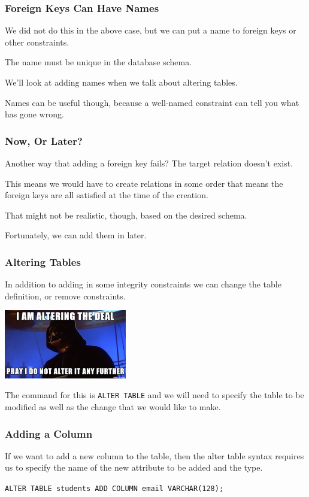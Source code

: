 \begin{frame}
\frametitle{Foreign Keys Can Have Names}

We did not do this in the above case, but we can put a name to foreign keys or other constraints. 

The name must be unique in the database schema. 

We'll look at adding names when we talk about altering tables. 

Names can be useful though, because a well-named constraint can tell you what has gone wrong.

\end{frame}

\begin{frame}
\frametitle{Now, Or Later?}

Another way that adding a foreign key fails? The target relation doesn't exist. 

This means we would have to create relations in some order that means the foreign keys are all satisfied at the time of the creation. 

That might not be realistic, though, based on the desired schema. 

Fortunately, we can add them in later.

\end{frame}


\begin{frame}
\frametitle{Altering Tables}

In addition to adding in some integrity constraints we can change the table definition, or remove constraints. 

\begin{center}
	\includegraphics[width=0.4\textwidth]{images/alter-deal.jpg}
\end{center}

The command for this is \texttt{ALTER TABLE} and we will need to specify the table to be modified as well as the change that we would like to make. 

\end{frame}

\begin{frame}
\frametitle{Adding a Column}

If we want to add a new column to the table, then the alter table syntax requires us to specify the name of the new attribute to be added and the type. 

\texttt{ALTER TABLE students ADD COLUMN email VARCHAR(128);} 

\end{frame}

